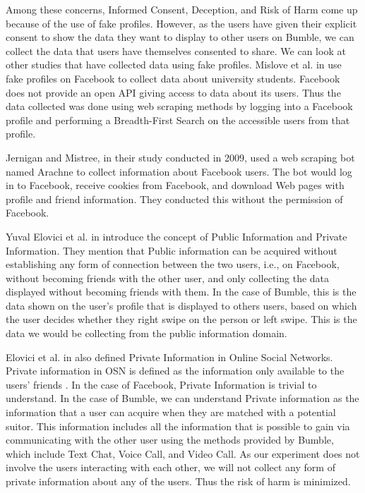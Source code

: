 Among these concerns, Informed Consent, Deception, and Risk of Harm come up because of the use of fake profiles. However, as the users have given their explicit consent to show the data they want to display to other users on Bumble, we can collect the data that users have themselves consented to share. We can look at other studies that have collected data using fake profiles. Mislove et al. in \cite{Mislove_Viswanath_Gummadi_Druschel_2010} use fake profiles on Facebook to collect data about university students. Facebook does not provide an open API giving access to data about its users. Thus the data collected was done using web scraping methods by logging into a Facebook profile and performing a Breadth-First Search on the accessible users from that profile.

Jernigan and Mistree, in their study \cite{Jernigan_Mistree_2009} conducted in 2009, used a web scraping bot named Arachne to collect information about Facebook users. The bot would log in to Facebook, receive cookies from Facebook, and download Web pages with profile and friend information. They conducted this without the permission of Facebook.

Yuval Elovici et al. in \cite{Elovici_Fire_Herzberg_Shulman_2014} introduce the concept of Public Information and Private Information. They mention that Public information can be acquired without establishing any form of connection between the two users, i.e., on Facebook, without becoming friends with the other user, and only collecting the data displayed without becoming friends with them. In the case of Bumble, this is the data shown on the user's profile that is displayed to others users, based on which the user decides whether they right swipe on the person or left swipe. This is the data we would be collecting from the public information domain.

Elovici et al. in \cite{Elovici_Fire_Herzberg_Shulman_2014} also defined Private Information in Online Social Networks. Private information in OSN is defined as the information only available to the users' friends \cite{Elovici_Fire_Herzberg_Shulman_2014}. In the case of Facebook, Private Information is trivial to understand. In the case of Bumble, we can understand Private information as the information that a user can acquire when they are matched with a potential suitor. This information includes all the information that is possible to gain via communicating with the other user using the methods provided by Bumble, which include Text Chat, Voice Call, and Video Call. As our experiment does not involve the users interacting with each other, we will not collect any form of private information about any of the users. Thus the risk of harm is minimized.

